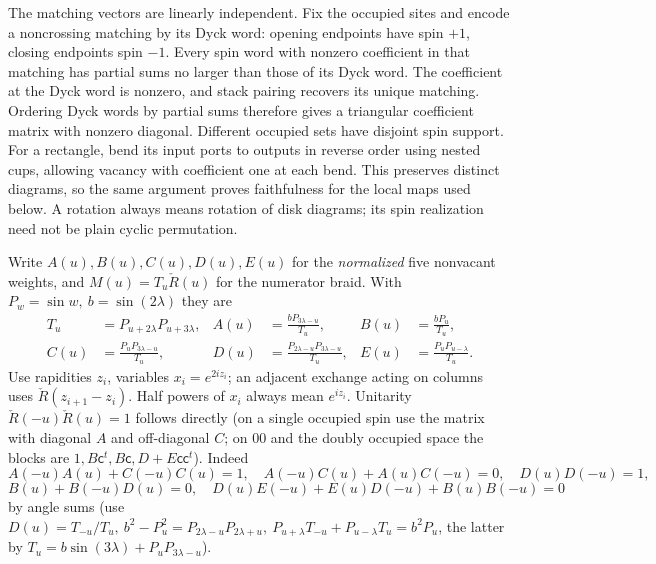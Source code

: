The matching vectors are linearly independent. Fix the occupied sites
and encode a noncrossing matching by its Dyck word: opening endpoints
have spin \(+1\), closing endpoints spin \(-1\). Every spin word with
nonzero coefficient in that matching has partial sums no larger than
those of its Dyck word. The coefficient at the Dyck word is nonzero,
and stack pairing recovers its unique matching. Ordering Dyck words by
partial sums therefore gives a triangular coefficient matrix with
nonzero diagonal. Different occupied sets have disjoint spin support.
For a rectangle, bend its input ports to outputs in reverse order using
nested cups, allowing vacancy with coefficient one at each bend. This
preserves distinct diagrams, so the same argument proves faithfulness
for the local maps used below. A rotation always means rotation of disk
diagrams; its spin realization need not be plain cyclic permutation.

Write \(A(u),B(u),C(u),D(u),E(u)\) for the \emph{normalized} five nonvacant weights, and \(M(u)=T_u\check R(u)\) for the numerator braid. With \(P_w=\sin w,\ b=\sin(2\lambda)\) they are
\[
\begin{aligned}
 T_u&=P_{u+2\lambda}P_{u+3\lambda},&
 A(u)&=\frac{bP_{3\lambda-u}}{T_u},& B(u)&=\frac{bP_u}{T_u},\\
 C(u)&=\frac{P_uP_{3\lambda-u}}{T_u},&
 D(u)&=\frac{P_{2\lambda-u}P_{3\lambda-u}}{T_u},&
 E(u)&=\frac{P_uP_{u-\lambda}}{T_u}.
\end{aligned}
\]
Use rapidities \(z_i\), variables \(x_i=e^{2iz_i}\); an adjacent exchange acting on columns uses \(\check R(z_{i+1}-z_i)\). Half powers of \(x_i\) always mean \(e^{iz_i}\). Unitarity \(\check R(-u)\check R(u)=1\) follows directly (on a single occupied spin use the matrix with diagonal \(A\) and off-diagonal \(C\); on 00 and the doubly occupied space the blocks are \(1,B\mathsf c^t,B\mathsf c,D+E\mathsf c\mathsf c^t\)). Indeed
\[
 A(-u)A(u)+C(-u)C(u)=1,\quad A(-u)C(u)+A(u)C(-u)=0,\quad D(u)D(-u)=1,
\]
\[
 B(u)+B(-u)D(u)=0,\quad D(u)E(-u)+E(u)D(-u)+B(u)B(-u)=0
\]
by angle sums (use \(D(u)=T_{-u}/T_u,\ b^2-P_u^2=P_{2\lambda-u}P_{2\lambda+u},\ P_{u+\lambda}T_{-u}+P_{u-\lambda}T_u=b^2P_u\), the latter by \(T_u=b\sin(3\lambda)+P_u P_{3\lambda-u}\)).

